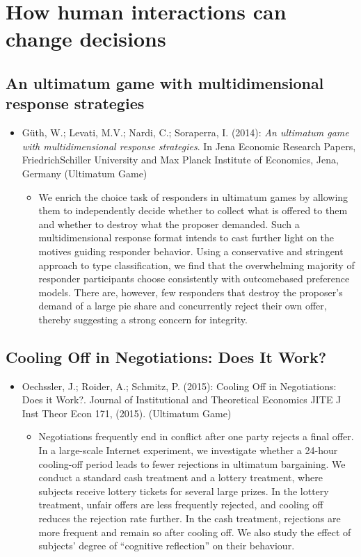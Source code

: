 
\chapter{How human interactions can change decisions}

\section{An ultimatum game with multidimensional response strategies} 

\begin{itemize}
	\item Güth, W.; Levati, M.V.; Nardi, C.; Soraperra, I. (2014): \textit{An ultimatum game with multidimensional response strategies}. In Jena Economic Research Papers, FriedrichSchiller University and Max Planck Institute of Economics, Jena, Germany (Ultimatum Game)
		\begin{itemize}
			\item We enrich the choice task of responders in ultimatum games by allowing them to independently decide whether to collect what is offered to them and whether to destroy what the proposer demanded. Such a multidimensional response format intends to cast further light on the motives guiding responder behavior. Using a conservative and stringent approach to type classification, we find that the overwhelming majority of responder participants choose consistently with outcomebased preference models. There are, however, few responders that destroy the proposer's demand of a large pie share and concurrently reject their own offer, thereby suggesting a strong concern for integrity.
		\end{itemize}
\end{itemize}
\vspace{-0.5cm}
\section{Cooling Off in Negotiations: Does It Work?}

\begin{itemize}
	\item Oechssler, J.; Roider, A.; Schmitz, P. (2015): Cooling Off in Negotiations: Does it Work?. Journal of Institutional and Theoretical Economics JITE J Inst Theor Econ 171, (2015). (Ultimatum Game)
		\begin{itemize}
			\item Negotiations frequently end in conflict after one party rejects a final offer. In a large-scale Internet experiment, we investigate whether a 24-hour cooling-off period leads to fewer rejections in ultimatum bargaining. We conduct a standard cash treatment and a lottery treatment, where subjects receive lottery tickets for several large prizes. In the lottery treatment, unfair offers are less frequently rejected, and cooling off reduces the rejection rate further. In the cash treatment, rejections are more frequent and remain so after cooling off. We also study the effect of subjects’ degree of “cognitive reflection” on their behaviour.
		\end{itemize}
\end{itemize}